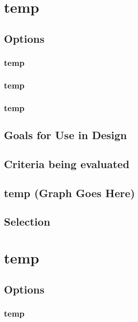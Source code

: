 \documentclass[10pt,letterpaper,onecolumn,journal]{IEEEtran}
\begin{document}
\section{temp}

\subsection{Options}
\subsubsection{temp}

\subsubsection{temp}

\subsubsection{temp}

\subsection{Goals for Use in Design}

\subsection{Criteria being evaluated}

\subsection*{temp (Graph Goes Here)}

\subsection{Selection}

\section{temp}

\subsection{Options}
\subsubsection{temp}
\end{document}
